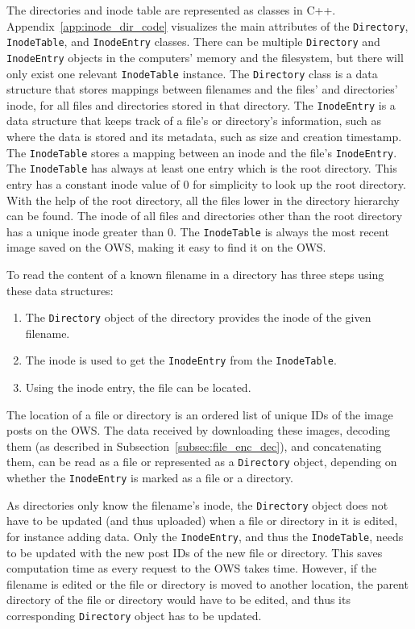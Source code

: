 The directories and inode table are represented as classes in C++. Appendix~\ref{app:inode_dir_code} visualizes the main attributes of the \texttt{Directory}, \texttt{InodeTable}, and \texttt{InodeEntry} classes. There can be multiple \texttt{Directory} and \texttt{InodeEntry} objects in the computers' memory and the filesystem, but there will only exist one relevant \texttt{InodeTable} instance. The \texttt{Directory} class is a data structure that stores mappings between filenames and the files' and directories' inode, for all files and directories stored in that directory. The \texttt{InodeEntry} is a data structure that keeps track of a file's or directory's information, such as where the data is stored and its metadata, such as size and creation timestamp. The \texttt{InodeTable} stores a mapping between an inode and the file's \texttt{InodeEntry}. The \texttt{InodeTable} has always at least one entry which is the root directory. This entry has a constant inode value of 0 for simplicity to look up the root directory. With the help of the root directory, all the files lower in the directory hierarchy can be found. The inode of all files and directories other than the root directory has a unique inode greater than 0. The \texttt{InodeTable} is always the most recent image saved on the \gls{OWS}, making it easy to find it on the \gls{OWS}.

To read the content of a known filename in a directory has three steps using these data structures:
\begin{enumerate}
	\item The \texttt{Directory} object of the directory provides the inode of the given filename.
	\item The inode is used to get the \texttt{InodeEntry} from the \texttt{InodeTable}.
	\item Using the inode entry, the file can be located.
\end{enumerate}
The location of a file or directory is an ordered list of unique IDs of the image posts on the \gls{OWS}. The data received by downloading these images, decoding them (as described in Subsection~\ref{subsec:file_enc_dec}), and concatenating them, can be read as a file or represented as a \texttt{Directory} object, depending on whether the \texttt{InodeEntry} is marked as a file or a directory. 

As directories only know the filename's inode, the \texttt{Directory} object does not have to be updated (and thus uploaded) when a file or directory in it is edited, for instance adding data. Only the \texttt{InodeEntry}, and thus the \texttt{InodeTable}, needs to be updated with the new post IDs of the new file or directory. This saves computation time as every request to the \gls{OWS} takes time. However, if the filename is edited or the file or directory is moved to another location, the parent directory of the file or directory would have to be edited, and thus its corresponding \texttt{Directory} object has to be updated.

